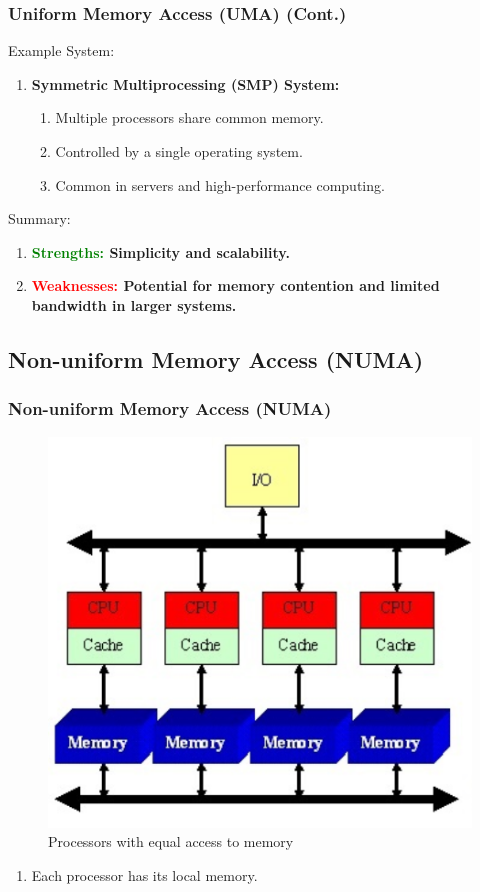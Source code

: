\documentclass[
	12pt, %
]{beamer}
\begin{document}
\begin{frame}
	\frametitle{Uniform Memory Access (UMA) (Cont.)}
	
	Example System:
	\begin{enumerate}
		\item \textbf{Symmetric Multiprocessing (SMP) System: }
		\begin{enumerate}
			\item Multiple processors share common memory.
			\item Controlled by a single operating system.
			\item Common in servers and high-performance computing.
		\end{enumerate}
	\end{enumerate}
	
	Summary:
	\begin{enumerate}
		\item \textbf{\textcolor{green}{Strengths:} Simplicity and scalability.}
		\item \textbf{\textcolor{red}{Weaknesses:} Potential for memory contention and limited bandwidth in larger systems.}
	\end{enumerate}
	
\end{frame}












\subsection{Non-uniform Memory Access (NUMA)}

\begin{frame}
	\frametitle{Non-uniform Memory Access (NUMA)}
	
	
	
	\begin{figure}[h]
		\centering
		\includegraphics[width=0.5\linewidth]{Images/img2}
		\caption{Processors with equal access to memory}
		\label{Processors with local memory}
	\end{figure}
	
	\begin{enumerate}
		\item Each processor has its local memory.
	\end{enumerate}
	
	
\end{frame}
\end{document}
